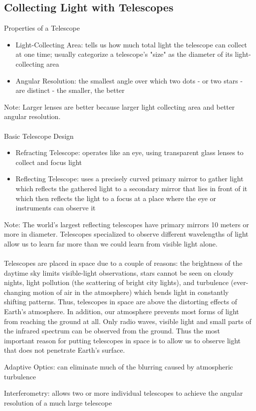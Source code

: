 \documentclass[12pt]{article}
\begin{document}
\subsection{Collecting Light with Telescopes} 
Properties of a Telescope \begin{itemize} 
\item Light-Collecting Area: tells us how much total light the telescope can collect at one time; usually categorize a telescope's "size" as the diameter of its light-collecting area 
\item Angular Resolution: the smallest angle over which two dots - or two stars - are distinct - the smaller, the better \end{itemize} 
Note: Larger lenses are better because larger light collecting area and better angular resolution.\\~\\
Basic Telescope Design \begin{itemize} 
\item Refracting Telescope: operates like an eye, using transparent glass lenses to collect and focus light
\item Reflecting Telescope: uses a precisely curved primary mirror to gather light which reflects the gathered light to a secondary mirror that lies in front of it which then reflects the light to a focus at a place where the eye or instruments can observe it \end{itemize} 
Note: The world's largest reflecting telescopes have primary mirrors 10 meters or more in diameter. Telescopes specialized to observe different wavelengths of light allow us to learn far more than we could learn from visible light alone. \\~\\
Telescopes are placed in space due to a couple of reasons: the brightness of the daytime sky limits visible-light observations, stars cannot be seen on cloudy nights, light pollution (the scattering of bright city lights), and turbulence (ever-changing motion of air in the atmosphere) which bends light in constantly shifting patterns. Thus, telescopes in space are above the distorting effects of Earth's atmosphere. In addition, our atmosphere prevents most forms of light from reaching the ground at all. Only radio waves, visible light and small parts of the infrared spectrum can be observed from the ground. Thus the most important reason for putting telescopes in space is to allow us to observe light that does not penetrate Earth's surface. 
\begin{definition} Adaptive Optics: can eliminate much of the blurring caused by atmospheric turbulence \end{definition}
\begin{definition} Interferometry: allows two or more individual telescopes to achieve the angular resolution of a much large telescope \end{definition}
\end{document}
